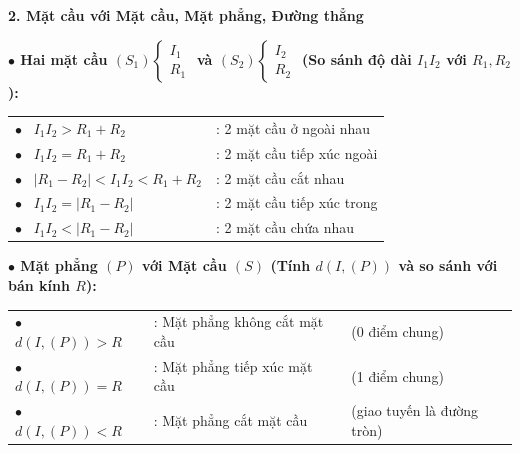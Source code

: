 \documentclass[12pt,a4paper]{article}
\begin{document}
\begin{theorybox}
    \textbf{\textcolor{deepblue}{\large 2. Mặt cầu với Mặt cầu, Mặt phẳng, Đường thẳng}}
    \par\vspace{6pt}

    \textbf{\textcolor{amberorange}{$\bullet$ Hai mặt cầu $(S_1)\begin{cases} I_1 \\ R_1 \end{cases}$ và $(S_2)\begin{cases} I_2 \\ R_2 \end{cases}$ (So sánh độ dài $I_1I_2$ với $R_1, R_2$):}}
    \renewcommand{\arraystretch}{1.35}
    \begin{center}
    \begin{tabular}{l l}
        $\bullet$ \ $I_1I_2 > R_1 + R_2$ & : 2 mặt cầu ở ngoài nhau \\
        $\bullet$ \ $I_1I_2 = R_1 + R_2$ & : 2 mặt cầu tiếp xúc ngoài \\
        $\bullet$ \ $|R_1 - R_2| < I_1I_2 < R_1 + R_2$ & : 2 mặt cầu cắt nhau \\
        $\bullet$ \ $I_1I_2 = |R_1 - R_2|$ & : 2 mặt cầu tiếp xúc trong \\
        $\bullet$ \ $I_1I_2 < |R_1 - R_2|$ & : 2 mặt cầu chứa nhau \\
    \end{tabular}
    \end{center}

    \vspace{4pt}
    \textbf{\textcolor{amberorange}{$\bullet$ Mặt phẳng $(P)$ với Mặt cầu $(S)$ (Tính $d(I, (P))$ và so sánh với bán kính $R$):}}
    \renewcommand{\arraystretch}{1.35}
    \begin{center}
    \begin{tabular}{l l l}
        $\bullet$ \ $d(I, (P)) > R$ & : Mặt phẳng không cắt mặt cầu & (0 điểm chung) \\
        $\bullet$ \ $d(I, (P)) = R$ & : Mặt phẳng tiếp xúc mặt cầu & (1 điểm chung) \\
        $\bullet$ \ $d(I, (P)) < R$ & : Mặt phẳng cắt mặt cầu & (giao tuyến là đường tròn) \\
    \end{tabular}
    \end{center}


\end{theorybox}
\end{document}
